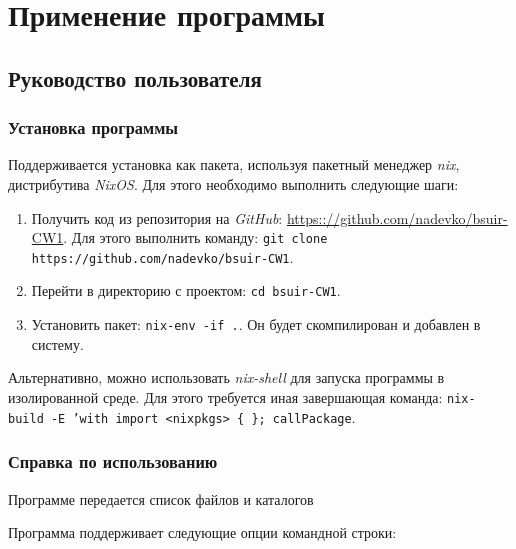 \chapter{Применение программы}

\section{Руководство пользователя}

\subsection{Установка программы}

Поддерживается установка как пакета, используя пакетный менеджер \textit{nix},
дистрибутива \textit{NixOS}. Для этого необходимо выполнить следующие шаги:

\begin{enumerate}
    \item Получить код из репозитория на \textit{GitHub}:
          \url{https:://github.com/nadevko/bsuir-CW1}. Для этого выполнить
          команду: \texttt{git clone https://github.com/nadevko/bsuir-CW1}.
    \item Перейти в директорию с проектом: \texttt{cd bsuir-CW1}.
    \item Установить пакет: \texttt{nix-env -if .}. Он будет скомпилирован и добавлен
          в систему.
\end{enumerate}

Альтернативно, можно использовать \textit{nix-shell} для запуска программы в
изолированной среде. Для этого требуется иная завершающая команда:
\texttt{nix-\\build -E~'with import <nixpkgs> \{ \}; callPackage}.

\subsection{Справка по использованию}

Программе передается список файлов и каталогов

Программа поддерживает следующие опции командной строки:

